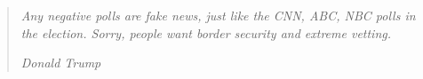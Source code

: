 \documentclass[thesis.tex]{subfiles}
\begin{document}
\chapter*{}
\null\vfill
\begin{quotation}
\em %
Any negative polls are fake news, just like the CNN, ABC, NBC polls in the election. Sorry, people want border security and extreme vetting.

\em
\medskip
\raggedleft
Donald Trump
\end{quotation}
\vfill\vfill
\end{document}
